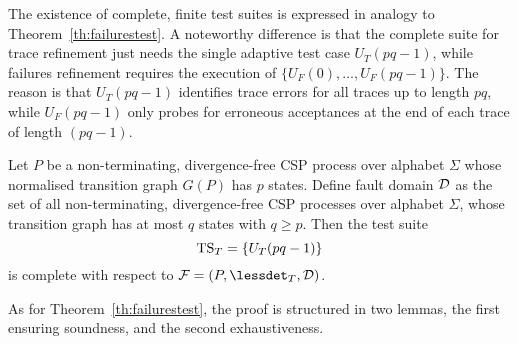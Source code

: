 The existence of complete, finite test suites is expressed in analogy to
Theorem~\ref{th:failurestest}. A noteworthy difference is that the complete
suite for trace refinement just needs the single adaptive test case
$U_T(pq-1)$, while failures refinement requires the execution of $\{
U_F(0),\dots,U_F(pq-1)\}$. The reason is that $U_T(pq-1)$ identifies trace
errors for all traces up to length $pq$, while $U_F(pq-1)$ only probes for
erroneous acceptances at the end of each trace of length $(pq -1)$.
%
\begin{theorem}\label{th:tracetest}
Let $P$ be a non-terminating, divergence-free CSP process over alphabet $\Sigma$ whose
normalised transition graph $G(P)$ has $p$ states. Define fault domain ${\cal
D}$ as the set of all non-terminating, divergence-free CSP processes over alphabet $\Sigma$,
whose transition graph has at most $q$ states with $q \ge p$. Then the test
suite
\[
{\text{TS}}_T = \{ U_T(pq-1)   \}
\]
is complete with respect to ${\cal F} = (P,\lessdet_T,{\cal D})$.
\xbox
\end{theorem}
%
As for Theorem~\ref{th:failurestest}, the proof is structured in two lemmas,
the first ensuring soundness, and the second exhaustiveness.

